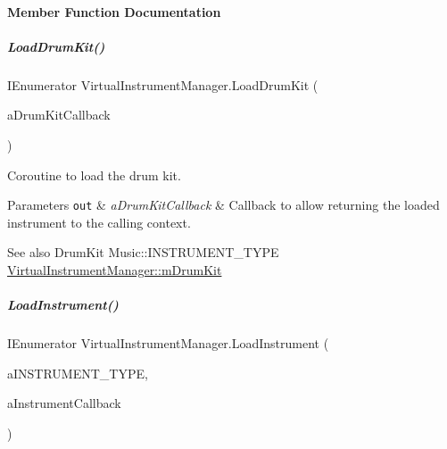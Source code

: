 \paragraph{Member Function Documentation}
\mbox{\label{group___virtual_instrument_manager_aba165ca4757b6c8555914fe6b42b638d}} 
\subparagraph{\texorpdfstring{Load\+Drum\+Kit()}{LoadDrumKit()}}
{\footnotesize\ttfamily I\+Enumerator Virtual\+Instrument\+Manager.\+Load\+Drum\+Kit (\begin{DoxyParamCaption}\item[{System.\+Action$<$ Virtual\+Instrument $>$}]{a\+Drum\+Kit\+Callback }\end{DoxyParamCaption})\hspace{0.3cm}{\ttfamily [private]}}



Coroutine to load the drum kit. 


\begin{DoxyParams}[1]{Parameters}
\mbox{\tt out}  & {\em a\+Drum\+Kit\+Callback} & Callback to allow returning the loaded instrument to the calling context.\\
\hline
\end{DoxyParams}
\begin{DoxySeeAlso}{See also}
Drum\+Kit Music\+::\+I\+N\+S\+T\+R\+U\+M\+E\+N\+T\+\_\+\+T\+Y\+PE \hyperlink{group___virtual_instrument_manager_a0bc7c9f776b0d2dae0ccb1f1ee5f2143}{Virtual\+Instrument\+Manager\+::m\+Drum\+Kit} 
\end{DoxySeeAlso}
\mbox{\label{group___virtual_instrument_manager_ab8082c1cc590771bf57da8b5ae8603d1}} 
\subparagraph{\texorpdfstring{Load\+Instrument()}{LoadInstrument()}}
{\footnotesize\ttfamily I\+Enumerator Virtual\+Instrument\+Manager.\+Load\+Instrument (\begin{DoxyParamCaption}\item[{Music.\+I\+N\+S\+T\+R\+U\+M\+E\+N\+T\+\_\+\+T\+Y\+PE}]{a\+I\+N\+S\+T\+R\+U\+M\+E\+N\+T\+\_\+\+T\+Y\+PE,  }\item[{System.\+Action$<$ Virtual\+Instrument $>$}]{a\+Instrument\+Callback }\end{DoxyParamCaption})\hspace{0.3cm}{\ttfamily [private]}}



